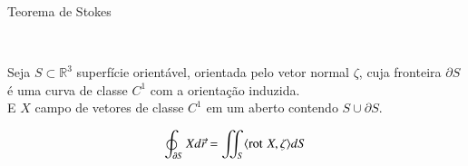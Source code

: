 \begin{large}
Teorema de Stokes
\end{large}\vspace{12pt}\\
\null\hspace{48pt} \begin{minipage}{\dimexpr\textwidth-30\fboxsep-2\fboxrule\relax}
Seja $S \subset \mathbb{R}^3$ superfície orientável, orientada pelo vetor normal $\zeta$, cuja fronteira $\partial S$ é uma curva de classe $C^1$ com a orientação induzida. \\
E $X$ campo de vetores de classe $C^1$ em um aberto contendo $S \cup \partial S$.
\end{minipage}
\begin{gather*}
\displaystyle\oint_{\partial S} X d\vec{r} = \displaystyle\iint_S \langle \operatorname{rot \,} X, \zeta \rangle dS
\end{gather*}
